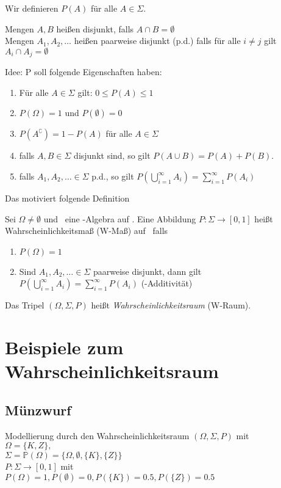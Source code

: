 Wir definieren $P(A)$ für alle $A \in \Sigma$.
\begin{definition}
    Mengen $A, B$ heißen disjunkt, falls $A\cap B = \emptyset$\\
    Mengen $A_1, A_2, \dots$ heißen paarweise disjunkt (p.d.) falls für alle $i \neq j$ gilt
    $A_i \cap A_j = \emptyset$
\end{definition}

Idee: P soll folgende Eigenschaften haben:
\begin{enumerate}
    \item Für alle $A\in \Sigma$ gilt: $0 \leq P(A)\leq 1$
    \item $P(\Omega) = 1$ und $P(\emptyset) = 0$
    \item $P(A^\complement) = 1-P(A)$ für alle $A\in \Sigma$
    \item falls $A,B\in\Sigma$ disjunkt sind, so gilt
          $P(A\cup B) = P(A) + P(B)$.
    \item falls $A_1, A_2,\dots \in \Sigma$ p.d., so gilt
          $P(\bigcup\limits_{i=1}^\infty A_i) = \sum_{i=1}^\infty P(A_i)$
\end{enumerate}

Das motiviert folgende Definition

\begin{definition}[Wahrscheinlichkeitsmaß]
    Sei $\Omega \neq \emptyset$ und \tS\ eine \ts-Algebra auf \tO.
    Eine Abbildung $P: \Sigma \to [0,1]$ heißt Wahrscheinlichkeitsmaß (W-Maß) auf \tS\ falls
    \begin{enumerate}
        \item $P(\Omega) = 1$
        \item Sind $A_1, A_2,\dots \in \Sigma$ paarweise disjunkt, dann gilt
              $P\left(\bigcup_{i=1}^\infty A_i\right) = \sum_{i=1}^\infty P(A_i)$
              (\ts-Additivität)
    \end{enumerate}
\end{definition}
\noindent
Das Tripel $\left( \Omega, \Sigma, P\right)$ heißt \emph{Wahrscheinlichkeitsraum} (W-Raum).

\section{Beispiele zum Wahrscheinlichkeitsraum}
\subsection{Münzwurf}
Modellierung durch den Wahrscheinlichkeitsraum $(\Omega, \Sigma, P)$ mit\\
$\Omega = \{K,Z\},$\\
$\Sigma = \mathbb{P}(\Omega) = \{ \Omega, \emptyset, \{K\}, \{Z\}\}$\\
$P: \Sigma \to [0,1]$ mit\\
$P(\Omega) = 1, P(\emptyset) = 0, P(\{K\}) = 0.5, P(\{Z\}) = 0.5$

